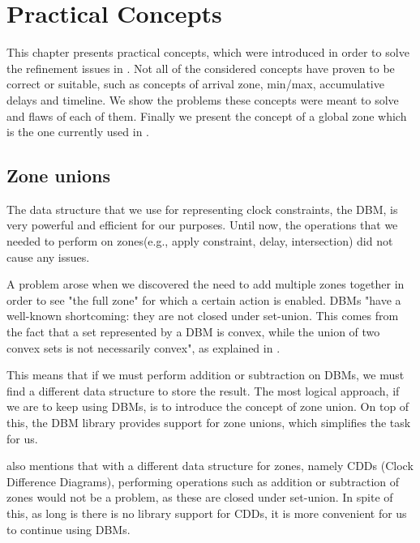 \chapter{Practical Concepts} \label{ch:concepts}
This chapter presents practical concepts, which were introduced in order to solve the refinement issues in \jecdar. Not all of the considered concepts have proven to be correct or suitable, such as concepts of arrival zone, min/max, accumulative delays and timeline. We show the problems these concepts were meant to solve and flaws of each of them. Finally we present the concept of a global zone which is the one currently used in \jecdar.

\section{Zone unions} \label{sec:zoneUnions}

The data structure that we use for representing clock constraints, the DBM, is very powerful and efficient for our purposes. Until now, the operations that we needed to perform on zones(e.g., apply constraint, delay, intersection) did not cause any issues.

A problem arose when we discovered the need to add multiple zones together in order to see "the full zone" for which a certain action is enabled. DBMs "have a well-known shortcoming: they are not closed under set-union. This comes from the fact that a set represented by a DBM is convex, while the union of two convex sets is not necessarily convex", as explained in \textcite{UppaalSecrets}.

This means that if we must perform addition or subtraction on DBMs, we must find a different data structure to store the result. The most logical approach, if we are to keep using DBMs, is to introduce the concept of zone union. On top of this, the DBM library provides support for zone unions, which simplifies the task for us.

\textcite{UppaalSecrets} also mentions that with a different data structure for zones, namely CDDs (Clock Difference Diagrams), performing operations such as addition or subtraction of zones would not be a problem, as these are closed under set-union. In spite of this, as long is there is no library support for CDDs, it is more convenient for us to continue using DBMs.

